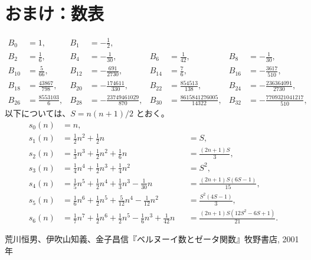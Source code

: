 {\section{おまけ：数表}
\begin{align*}
  B_0&=1, &
  B_1&=-\frac12, \\
  B_2&=\frac16, &
  B_4&=-\frac{1}{30}, &
  B_6&=\frac{1}{42}, &
  B_8&=-\frac{1}{30}, \\
  B_{10}&=\frac{5}{66}, &
  B_{12}&=-\frac{691}{2730}, &
  B_{14}&=\frac{7}{6}, &
  B_{16}&=-\frac{3617}{510}, \\
  B_{18}&=\frac{43867}{798}, &
  B_{20}&=-\frac{174611}{330}, &
  B_{22}&=\frac{854513}{138}, &
  B_{24}&=-\frac{236364091}{2730}, \\
  B_{26}&=\frac{8553103}{6}, &
  B_{28}&=-\frac{23749461029}{870}, &
  B_{30}&=\frac{8615841276005}{14322}, &
  B_{32}&=-\frac{7709321041217}{510},
\end{align*}
以下については、$S=n(n+1)/2$ とおく。
\begin{align*}
  s_0(n)&=n, \\
  s_1(n)&=\frac12 n^2+\frac12 n &
       &=S, \\
  s_2(n)&=\frac13 n^3+\frac12 n^2+\frac16 n &
        &=\frac{(2n+1)S}{3}, \\
  s_3(n)&=\frac14 n^4+\frac12 n^3+\frac14 n^2 &
        &=S^2, \\
  s_4(n)&=\frac15 n^5+\frac12 n^4+\frac13 n^3-\frac{1}{30} n &
                                &=\frac{(2n+1)S(6S-1)}{15}, \\
  s_5(n)&=\frac16 n^6+\frac12 n^5+\frac{5}{12} n^4-\frac{1}{12} n^2 &
                                &=\frac{S^2(4S-1)}{3}, \\
  s_6(n)&=\frac17 n^7+\frac12 n^6+\frac12 n^5-\frac16 n^3+\frac{1}{42}n &
                                &=\frac{(2n+1)S(12S^2-6S+1)}{21}.
\end{align*}

\begin{thebibliography}{9}
  荒川恒男、伊吹山知義、金子昌信『ベルヌーイ数とゼータ関数』牧野書店, 2001年
\end{thebibliography}
}
